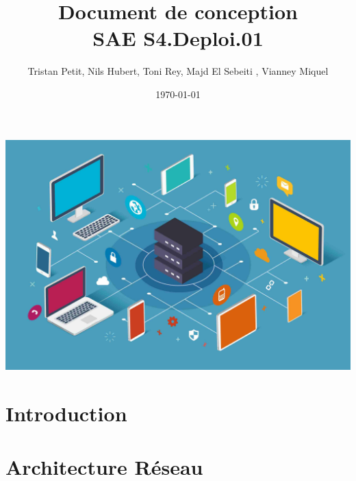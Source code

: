 \documentclass{article}
\begin{document}
\title{Document de conception \\ SAE S4.Deploi.01}
\author{Tristan Petit, Nils Hubert, Toni Rey, 
 Majd El Sebeiti , Vianney Miquel}
\date{\today}
\maketitle
\begin{center}
    \vspace{1cm} %
    \includegraphics[width=1\textwidth]{images/Logo-project.jpeg} %
\end{center}

\maketitle


\newpage


\renewcommand{\contentsname}{Table des matières}

\tableofcontents

\newpage
{}

\section{Introduction}


\section{Architecture Réseau}
\end{document}
